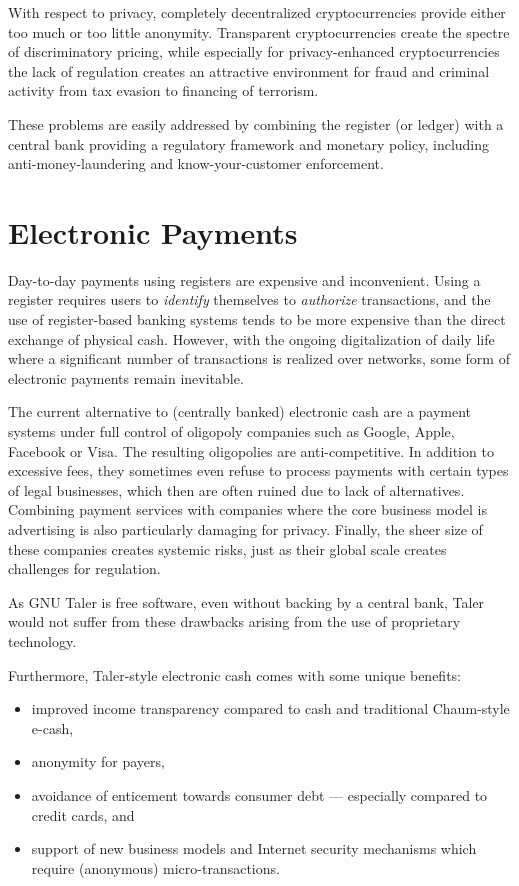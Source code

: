 With respect to privacy, completely decentralized cryptocurrencies
provide either too much or too little anonymity.  Transparent
cryptocurrencies create the spectre of discriminatory pricing, while
especially for privacy-enhanced cryptocurrencies the lack of
regulation creates an attractive environment for fraud and criminal
activity from tax evasion to financing of terrorism.

These problems are easily addressed by combining the register (or
ledger) with a central bank providing a regulatory framework and
monetary policy, including anti-money-laundering and
know-your-customer enforcement.  

\section{Electronic Payments}

Day-to-day payments using registers are expensive and inconvenient.
Using a register requires users to {\em identify} themselves to {\em
  authorize} transactions, and the use of register-based banking
systems tends to be more expensive than the direct exchange of
physical cash.  However, with the ongoing digitalization of daily life
where a significant number of transactions is realized over networks,
some form of electronic payments remain inevitable.

The current alternative to (centrally banked) electronic cash are a
payment systems under full control of oligopoly companies such as
Google, Apple, Facebook or Visa.  The resulting oligopolies are
anti-competitive. In addition to excessive fees, they sometimes even
refuse to process payments with certain types of legal businesses,
which then are often ruined due to lack of alternatives.  Combining
payment services with companies where the core business model is
advertising is also particularly damaging for privacy.  Finally, the
sheer size of these companies creates systemic risks, just as their
global scale creates challenges for regulation.

As GNU Taler is free software, even without backing by a central bank,
Taler would not suffer from these drawbacks arising from the use of
proprietary technology.

Furthermore, Taler-style electronic cash comes
with some unique benefits:
\begin{itemize}
  \item improved income transparency compared to cash and traditional
    Chaum-style e-cash,
  \item anonymity for payers,
  \item avoidance of enticement towards consumer debt --- especially
    compared to credit cards, and
  \item support of new business models and Internet security
    mechanisms which require (anonymous) micro-transactions.
\end{itemize}

